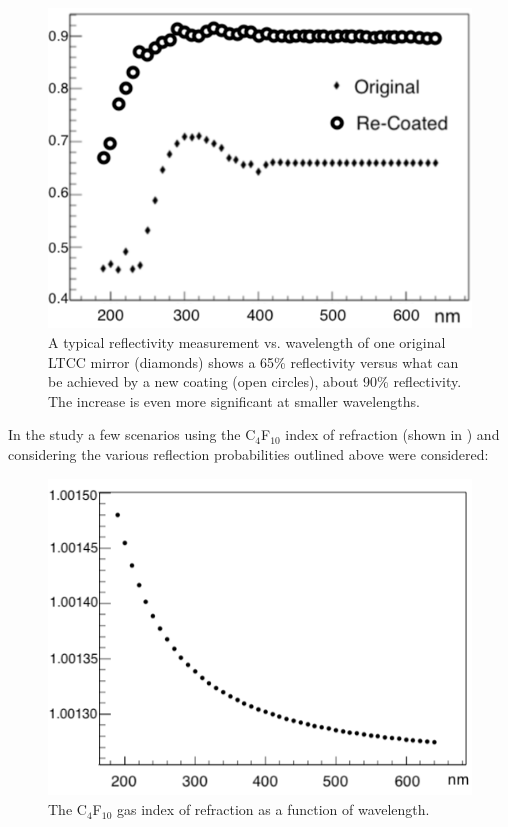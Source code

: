 \begin{figure}
	\centering
	\includegraphics[width=0.98\columnwidth, height=0.7\columnwidth]{img/reflectivityGain.png}
	\caption{A typical reflectivity measurement vs. wavelength of one original LTCC mirror (diamonds)
			shows a 65\% reflectivity versus what can be achieved
			by a new coating (open circles), about 90\% reflectivity. The increase is even more significant at smaller
                        wavelengths.}
	\label{fig:reflectivityGain}
\end{figure}

In the study a few scenarios using the C$_4$F$_{10}$ index of refraction (shown in )
and considering the various reflection probabilities outlined above  were considered:

\begin{figure}
	\centering
	\includegraphics[width=0.98\columnwidth, height=0.65\columnwidth]{img/c4f10RefrIndex.png}
	\caption{The C$_4$F$_{10}$ gas index of refraction as a function of wavelength.}
	\label{fig:c4f10RefrIndex}
\end{figure}

